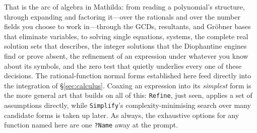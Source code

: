 
That is the arc of algebra in Mathilda: from reading a polynomial's structure, through
expanding and factoring it---over the rationals and over the number fields you choose to
work in---through the GCDs, resultants, and Gr\"obner bases that eliminate variables, to
solving single equations, systems, the complete real solution sets that 
describes, the integer solutions that the Diophantine engines find or prove absent, the refinement of
an expression under whatever you know about its symbols, and the zero test that quietly
underlies every one of these decisions. The
rational-function normal forms established here feed directly into the integration of
\S\ref{sec:calculus}. Coaxing an expression into its \emph{simplest} form is the more
general art that builds on all of this: \texttt{Refine}, just seen, applies a set of
assumptions directly, while \texttt{Simplify}'s complexity-minimising search over many
candidate forms is taken up later. As always, the exhaustive options for any function
named here are one \texttt{?Name} away at the prompt.
